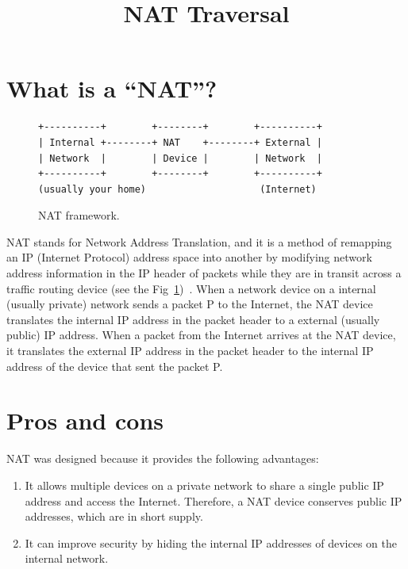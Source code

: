 
\title{NAT Traversal}

\maketitle
\tableofcontents

\section{What is a ``NAT''?}

\begin{figure}
\begin{verbatim}
+----------+        +--------+        +----------+
| Internal +--------+ NAT    +--------+ External |
| Network  |        | Device |        | Network  |
+----------+        +--------+        +----------+
(usually your home)                    (Internet)
\end{verbatim}
\caption{NAT framework.}
\label{fig:NAT_framework}
\end{figure}

NAT stands for Network Address Translation, and it is a method of
remapping an IP (Internet Protocol) address space into another by
modifying network address information in the IP header of packets
while they are in transit across a traffic routing device (see the
Fig~\ref{fig:NAT_framework})~\cite{srisuresh1999nat,Srisuresh2001}. When
a network device on a internal (usually private) network sends a
packet P to the Internet, the NAT device translates the internal IP
address in the packet header to a external (usually public) IP
address. When a packet from the Internet arrives at the NAT device, it
translates the external IP address in the packet header to the
internal IP address of the device that sent the packet P.

\section{Pros and cons}

NAT was designed because it provides the following advantages:
\begin{enumerate}
\item It allows multiple devices on a private network to share a
  single public IP address and access the Internet. Therefore, a NAT
  device conserves public IP addresses, which are in short supply.
\item It can improve security by hiding the internal IP addresses of
  devices on the internal network.
\end{enumerate}

